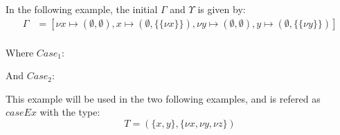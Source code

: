 \documentclass[../master.tex]{subfiles}
\begin{document}
In the following example, the initial $\Gamma$ and $\Upsilon$ is given by:
\begin{align*}
	\Gamma &= [\nu x\mapsto(\emptyset,\emptyset),x\mapsto(\emptyset,\{\{\nu x\}\}),\nu y\mapsto(\emptyset,\emptyset),y\mapsto(\emptyset,\{\{\nu y\}\})]\\
\end{align*}
\begin{figure}[H]
	\setlength\tabcolsep{8pt}
	
	\label{fig:SimpleCase}
\end{figure}

Where $Case_1$:
\begin{figure}[H]
	
\end{figure}
And $Case_2$:
\begin{figure}[H]
	
\end{figure}


This example will be used in the two following examples, and is refered as $caseEx$ with the type:
$$T=(\{x,y\},\{\nu x, \nu y, \nu z\})$$
\end{document}
